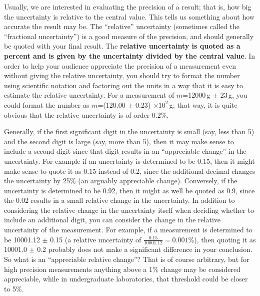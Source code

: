 Usually, we are interested in evaluating the precision of a result; that is, how big the uncertainty is relative to the central value. This tells us something about how accurate the result may be.  The ``relative'' uncertainty (sometimes called the ``fractional uncertainty'') is a good measure of the precision, and should generally be quoted with your final result. The \textbf{relative uncertainty is quoted as a percent and is given by the uncertainty divided by the central value}. In order to help your audience appreciate the precision of a measurement even without giving the relative uncertainty, you should try to format the number using scientific notation and factoring out the units in a way that it is easy to estimate the relative uncertainty. For a measurement of $m$=12000\,g $\pm$ 23\,g, you could format the number as $m$=(120.00 $\pm$ 0.23) $\times 10^2$\,g; that way, it is quite obvious that the relative uncertainty is of order 0.2\%.

Generally, if the first significant digit in the uncertainty is small (say, less than 5) and the second digit is large (say, more than 5), then it may make sense to include a second digit since that digit results in an ``appreciable change'' in the uncertainty. For example if an uncertainty is determined to be 0.15, then it might make sense to quote it as 0.15 instead of 0.2, since the additional decimal changes the uncertainty by 25\% (an arguably appreciable change). Conversely, if the uncertainty is determined to be 0.92, then it might as well be quoted as 0.9, since the 0.02 results in a small relative change in the uncertainty. In addition to considering the relative change in the uncertainty itself when deciding whether to include an additional digit, you can consider the change in the relative uncertainty of the measurement. For example, if a measurement is determined to be 10001.12 $\pm$ 0.15 (a relative uncertainty of $\frac{0.15}{10001.12}=0.001\%$), then quoting it as 10001.0 $\pm$ 0.2 probably does not make a significant difference in your conclusion. So what is an ``appreciable relative change''? That is of course arbitrary, but for high precision measurements anything above a 1\% change may be considered appreciable, while in undergraduate laboratories, that threshold could be closer to 5\%. 

